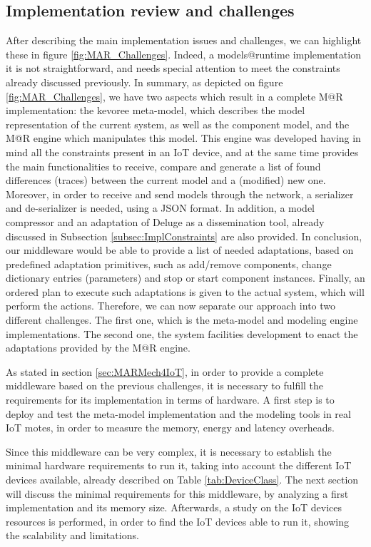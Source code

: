 \subsection{Implementation review and challenges}
\label{subsec:implReview}
After describing the main implementation issues and challenges, we can highlight these in figure \ref{fig:MAR_Challenges}.
Indeed, a models@runtime implementation it is not straightforward, and needs special attention to meet the constraints already discussed previously.
In summary, as depicted on figure \ref{fig:MAR_Challenges}, we have two aspects which result in a complete M@R implementation: the kevoree meta-model, which describes the model representation of the current system, as well as the component model, and the M@R engine which manipulates this model.
This engine was developed having in mind all the constraints present in an IoT device, and at the same time provides the main functionalities to receive, compare and generate a list of found differences (traces) between the current model and a (modified) new one.
Moreover, in order to receive and send models through the network, a serializer and de-serializer is needed, using a JSON format.
In addition, a model compressor and an adaptation of Deluge as a dissemination tool, already discussed in Subsection \ref{subsec:ImplConstraints} are also provided.
In conclusion, our middleware would be able to provide a list of needed adaptations, based on predefined adaptation primitives, such as add/remove components, change dictionary entries (parameters) and stop or start component instances.
Finally, an ordered plan to execute such adaptations is given to the actual system, which will perform the actions.
Therefore, we can now separate our approach into two different challenges.
The first one, which is the meta-model and modeling engine implementations.
The second one, the system facilities development to enact the adaptations provided by the M@R engine.

As stated in section \ref{sec:MARMech4IoT}, in order to provide a complete middleware based on the previous challenges, it is necessary to fulfill the requirements for its implementation in terms of hardware.
A first step is to deploy and test the meta-model implementation and the modeling tools in real IoT motes, in order to measure the memory, energy and latency overheads.

Since this middleware can be very complex, it is necessary to establish the minimal hardware requirements to run it, taking into account the different IoT devices available, already described on Table \ref{tab:DeviceClass}.
The next section will discuss the minimal requirements for this middleware, by analyzing a first implementation and its memory size.
Afterwards, a study on the IoT devices resources is performed, in order to find the IoT devices able to run it, showing the scalability and limitations.

